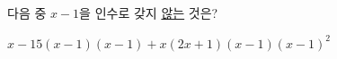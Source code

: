 다음 중 $x-1$을 인수로 갖지 \underline{않는} 것은?
\begin{choicesii}{$x-1$}{$5(x-1)$}{$(x-1)+x$}{$(2x+1)(x-1)$}{$(x-1)^2$}\end{choicesii}
